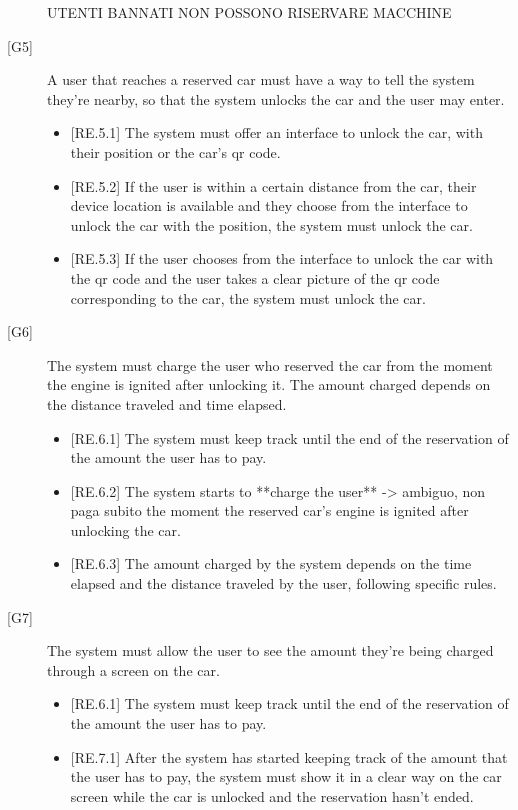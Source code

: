 \documentclass[english]{article}
\begin{document}
\begin{description}
{\begin{itemize}
UTENTI BANNATI NON POSSONO RISERVARE MACCHINE

\end{itemize}
}

\item[{[G5]}]{A user that reaches a reserved car must have a way to tell the system they’re nearby, so that the system unlocks the car and the user may enter.
\begin{itemize}
	\item{[RE.5.1] The system must offer an interface to unlock the car, with their position or the car's qr code.}
	\item{[RE.5.2] If the user is within a certain distance from the car, their device location is available and they choose from the interface to unlock the car with the position, the system must unlock the car.}
	\item{[RE.5.3] If the user chooses from the interface to unlock the car with the qr code and the user takes a clear picture of the qr code corresponding to the car, the system must unlock the car.}
\end{itemize}
}

\item[{[G6]}]{The system must charge the user who reserved the car from the moment the engine is ignited after unlocking it. The amount charged depends on the distance traveled and time elapsed.
\begin{itemize}
	\item{[RE.6.1] The system must keep track until the end of the reservation of the amount the user has to pay.}
	\item{[RE.6.2] The system starts to **charge the user** -> ambiguo, non paga subito  the moment the reserved car’s engine is ignited after unlocking the car.}
	\item{[RE.6.3] The amount charged by the system depends on the time elapsed and the distance traveled by the user, following specific rules.}
\end{itemize}
}

\item[{[G7]}]{The system must allow the user to see the amount they’re being charged through a screen on the car.
\begin{itemize}
	\item{[RE.6.1] The system must keep track until the end of the reservation of the amount the user has to pay.}
	\item{[RE.7.1] After the system has started keeping track of the amount that the user has to pay, the system must show it in a clear way on the car screen while the car is unlocked and the reservation hasn’t ended.}
\end{itemize}
}


\end{description}
\end{document}
